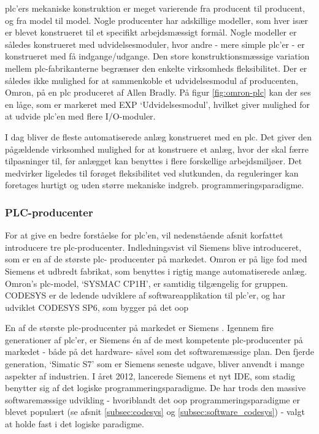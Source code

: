 
\noindent \gls{plc}'ers mekaniske konstruktion er meget varierende fra producent til producent, og fra model til model. Nogle producenter har adskillige modeller, som hver især er blevet konstrueret til et specifikt arbejdsmæssigt formål. Nogle modeller er således konstrueret med udvidelsesmoduler, hvor andre - mere simple \gls{plc}'er - er konstrueret med få indgange/udgange. 
Den store konstruktionsmæssige variation mellem \gls{plc}-fabrikanterne begrænser den enkelte virksomheds fleksibilitet. Der er således ikke mulighed for at sammenkoble et udvidelsesmodul af producenten, Omron, på en \gls{plc} produceret af Allen Bradly\cite{PLC-comb}. På figur \ref{fig:omron-plc} kan der ses en låge, som er markeret med EXP \enquote*{Udvidelsesmodul}, hvilket giver mulighed for at udvide \gls{plc}'en med flere I/O-moduler. 

I dag bliver de fleste automatiserede anlæg konstrueret med en \gls{plc}. Det giver den pågældende virksomhed mulighed for at konstruere et anlæg, hvor der skal færre tilpasninger til, før anlægget kan benyttes i flere forskellige arbejdsmiljøer. Det medvirker ligeledes til forøget fleksibilitet ved slutkunden, da reguleringer kan foretages hurtigt og uden større mekaniske indgreb.
 programmeringsparadigme.

\subsubsection{PLC-producenter}
\label{sec:plc}
\noindent For at give en bedre forståelse for \gls{plc}'en, vil nedenstående afsnit korfattet introducere tre \gls{plc}-producenter. Indledningsvist vil Siemens blive introduceret, som er en af de største \gls{plc}-
producenter på markedet. Omron er på lige fod med Siemens et udbredt fabrikat, som benyttes i rigtig mange automatiserede anlæg. Omron's \gls{plc}-model, \enquote*{SYSMAC CP1H}, er samtidig tilgængelig for gruppen. CODESYS er de ledende udviklere af softwareapplikation til \gls{plc}'er, og har udviklet CODESYS SP6, som bygger på det \gls{oop}

\label{subsec:siemens}
\noindent En af de største \gls{plc}-producenter på markedet er Siemens \cite{plc-marked-shares}. Igennem fire generationer af \gls{plc}'er, er Siemens én af de mest kompetente \gls{plc}-producenter på markedet - både på det hardware- såvel som det softwaremæssige plan. Den fjerde generation, \enquote*{Simatic S7} som er Siemens seneste udgave, bliver anvendt i mange aspekter af industrien. I året 2012, lancerede Siemens et nyt IDE, som stadig benytter sig af det logiske programmeringsparadigme. De har trods den massive softwaremæssige udvikling - hvoriblandt det \gls{oop} programmeringsparadigme er blevet populært (se afsnit \ref{subsec:codesys} og \ref{subsec:software_codesys}) - valgt at holde fast i det logiske paradigme. \\

